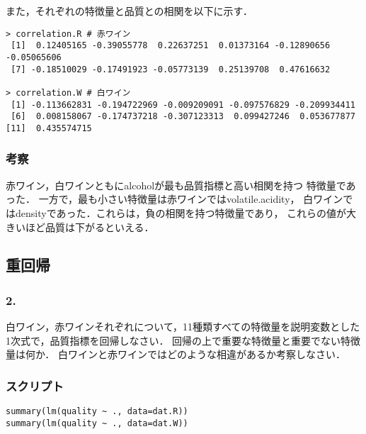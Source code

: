 \documentclass{jsarticle}
\begin{document}
また，それぞれの特徴量と品質との相関を以下に示す．
\begin{verbatim}
> correlation.R # 赤ワイン
 [1]  0.12405165 -0.39055778  0.22637251  0.01373164 -0.12890656 -0.05065606
 [7] -0.18510029 -0.17491923 -0.05773139  0.25139708  0.47616632

> correlation.W # 白ワイン
 [1] -0.113662831 -0.194722969 -0.009209091 -0.097576829 -0.209934411
 [6]  0.008158067 -0.174737218 -0.307123313  0.099427246  0.053677877
[11]  0.435574715
\end{verbatim}

\subsubsection*{考察}
赤ワイン，白ワインともにalcoholが最も品質指標と高い相関を持つ
特徴量であった．
一方で，最も小さい特徴量は赤ワインではvolatile.acidity，
白ワインではdensityであった．これらは，負の相関を持つ特徴量であり，
これらの値が大きいほど品質は下がるといえる．

\subsection*{重回帰}
\subsubsection*{2.}
白ワイン，赤ワインそれぞれについて，11種類すべての特徴量を説明変数とした
1次式で，品質指標を回帰しなさい．
回帰の上で重要な特徴量と重要でない特徴量は何か．
白ワインと赤ワインではどのような相違があるか考察しなさい．

\subsubsection*{スクリプト}
\begin{lstlisting}[basicstyle=\ttfamily\footnotesize, frame=single]
summary(lm(quality ~ ., data=dat.R))
summary(lm(quality ~ ., data=dat.W))
\end{lstlisting}
\end{document}

